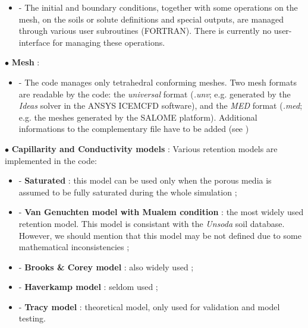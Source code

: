 \begin{list}{-}{}
\begin {itemize}
    \item [-] The initial and boundary conditions, together with some operations on the mesh, on the soils or solute definitions and special outputs, are managed through various user subroutines (FORTRAN). There is currently no user-interface for managing these operations.
% 
   \end{itemize}
\vspace{5pt}
% 
\item[$\bullet$] \textbf{Mesh} :
%
  \begin {itemize}
    \item [-] The code manages only tetrahedral conforming meshes. Two mesh formats are readable by the code: the \textit{universal} format (\textit{.unv}; e.g. generated by the \textit{Ideas} solver in the ANSYS ICEMCFD software), and the \textit{MED} format (\textit{.med}; e.g. the meshes generated by the SALOME platform). Additional informations to the complementary file have to be added (see \cite{userguide})
  \end{itemize}
%
\vspace{5pt}
%
\item[$\bullet$] \textbf{ Capillarity and Conductivity models} :
% 
Various retention models are implemented in the code:
  \begin {itemize}
    \item [-] {\bf Saturated} : this model can be used only when the porous media is assumed to be fully saturated during the whole simulation ;
    \item [-] {\bf Van Genuchten model with Mualem condition} : the most widely used retention model. This model is consistant with the \textit{Unsoda} soil database. However, we should mention that this model may be not defined due to some mathematical inconsistencies ;
    \item [-] {\bf Brooks \& Corey model} : also widely used ;
    \item [-] {\bf Haverkamp model} : seldom used ;
    \item [-] {\bf Tracy model} : theoretical model, only used for validation and model testing.
  \end {itemize}
%
\vspace{5pt}
% 

\end{list}
